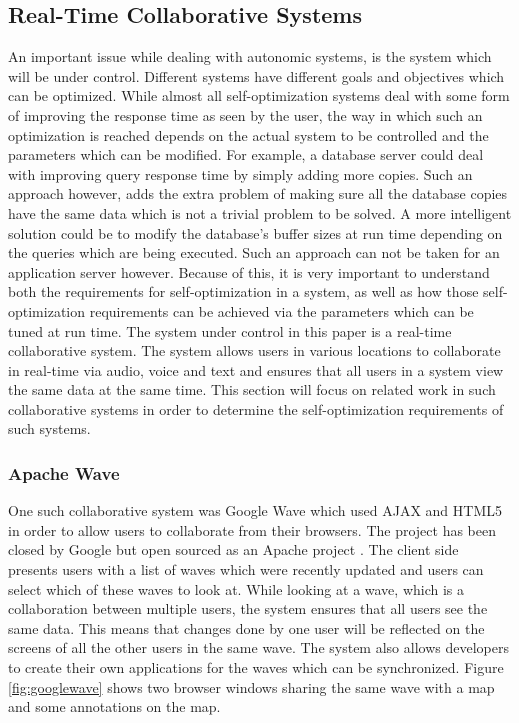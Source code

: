 \subsection{Real-Time Collaborative Systems}

An important issue while dealing with autonomic systems, is the system which will be under control. Different systems have different goals and objectives which can be optimized. While almost all self-optimization systems deal with some form of improving the response time as seen by the user, the way in which such an optimization is reached depends on the actual system to be controlled and the parameters which can be modified. For example, a database server could deal with improving query response time by simply adding more copies. Such an approach however, adds the extra problem of making sure all the database copies have the same data which is not a trivial problem to be solved. A more intelligent solution could be to modify the database's buffer sizes at run time depending on the queries which are being executed. Such an approach can not be taken for an application server however. Because of this, it is very important to understand both the requirements for self-optimization in a system, as well as how those self-optimization requirements can be achieved via the parameters which can be tuned at run time. The system under control in this paper is a real-time collaborative system. The system allows users in various locations to collaborate in real-time via audio, voice and text and ensures that all users in a system view the same data at the same time. This section will focus on related work in such collaborative systems in order to determine the self-optimization requirements of such systems.

\subsubsection{Apache Wave}

One such collaborative system was Google Wave which used AJAX and HTML5 in order to allow users to collaborate from their browsers. The project has been closed by Google but open sourced as an Apache project \cite{product:wave}. The client side presents users with a list of waves which were recently updated and users can select which of these waves to look at. While looking at a wave, which is a collaboration between multiple users, the system ensures that all users see the same data. This means that changes done by one user will be reflected on the screens of all the other users in the same wave. The system also allows developers to create their own applications for the waves which can be synchronized. Figure \ref{fig:googlewave} shows two browser windows sharing the same wave with a map and some annotations on the map.

